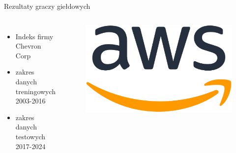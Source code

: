\begin{frame}{Rezultaty graczy giełdowych}
    \begin{columns}[t]
            \begin{itemize}
                \item Indeks firmy Chevron Corp
                \item zakres danych treningowych 2003-2016
                \item zakres danych testowych 2017-2024
            \end{itemize}
        \centering
        \begin{figure}
            \centering
            \includegraphics[width=1\textwidth]{images/aws_logo.png}
        \end{figure}    
    \end{columns}
\end{frame}
